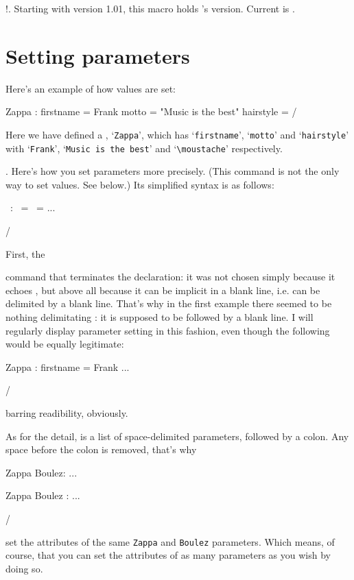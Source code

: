 \describe!\yaxversion.
Starting with version 1.01, this macro holds \yax's version. Current is \yaxversion.




\section{Setting parameters}

\noindent Here's an example of how values are set:

\example
\setparameter Zappa :
  firstname = Frank
  motto     = "Music is the best"
  hairstyle = \moustache
\example/

\noindent Here we have defined a , `\verb/Zappa/', which
has  `\verb/firstname/', `\verb/motto/' and `\verb/hairstyle/'
with  `\verb/Frank/', `\verb/Music is the best/' and `\verb/\moustache/'
respectively. 

\describe*\setparameter.
Here's how you set parameters more precisely. (This command is not the only way to set values.
See below.)
Its simplified syntax is as follows:

\syntax
\noindent\com\setparameter \paralist\ :
  \attrlist\ = \value
  \attrlist\ = \value
  ...
\noindent\com\par
\syntax/

\noindent First, the \com\par command that terminates the declaration:
it was not chosen simply because it echoes , but above
all because it can be implicit in a blank line, i.e. \com\setparameter
can be delimited by a blank line. That's why in the first example there
seemed to be nothing delimitating \com\setparameter: it is supposed to
be followed by a blank line. I will regularly display parameter setting in this
fashion, even though the following would be equally legitimate:

\example
\setparameter Zappa : firstname = Frank ... \par
\example/

\noindent barring readibility, obviously.

As for the detail, \paralist is a list of space-delimited parameters,
followed by a colon. Any space before the colon is removed, that's why

\example
\setparameter Zappa Boulez:  ... \par
\setparameter Zappa Boulez : ... \par
\example/

\noindent set the attributes of the same \verb/Zappa/ and \verb/Boulez/ parameters.
Which means, of course, that you can set the attributes of as many parameters
as you wish by doing so. 

